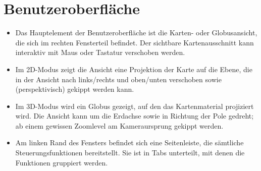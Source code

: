 
\chapter{Benutzeroberfläche}
\begin{itemize}
\item Das Hauptelement der Benutzeroberfläche ist die Karten- oder Globusansicht, die sich im rechten Fensterteil befindet. Der sichtbare Kartenausschnitt kann interaktiv mit Maus oder Tastatur verschoben werden.
\item Im 2D-Modus zeigt die Ansicht eine Projektion der Karte auf die Ebene, die in der Ansicht nach links/rechts und oben/unten verschoben sowie (perspektivisch) gekippt werden kann.
\item Im 3D-Modus wird ein Globus gezeigt, auf den das Kartenmaterial projiziert wird. Die Ansicht kann um die Erdachse sowie in Richtung der Pole gedreht; ab einem gewissen Zoomlevel am Kameraursprung gekippt werden.
\item Am linken Rand des Fensters befindet sich eine Seitenleiste, die sämtliche Steuerungsfunktionen bereitstellt. Sie ist in Tabs unterteilt, mit denen die Funktionen gruppiert werden.
\end{itemize}

